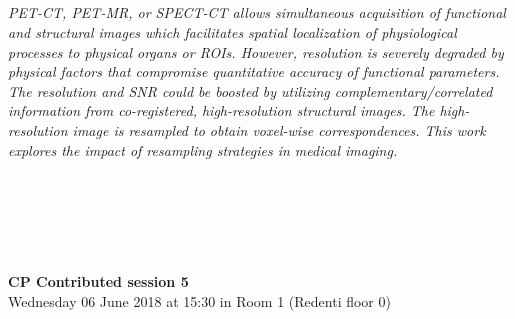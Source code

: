 \begin{multicols}{2}
      \\\\
      \\
      \\\\
      \\
      \\\\
\\
    \textit{PET-CT, PET-MR, or SPECT-CT allows simultaneous acquisition of functional and structural images which facilitates spatial localization of physiological processes to physical organs or ROIs. However, resolution is severely degraded by physical factors that compromise quantitative accuracy of functional parameters. The resolution and SNR could be boosted by utilizing complementary/correlated information from co-registered, high-resolution structural images. The high-resolution image is resampled to obtain voxel-wise correspondences. This work explores the impact of resampling strategies in medical imaging.}\\
\\ 
      \\
      \\\\
\\
  \end{multicols}
  \noindent\textbf{CP Contributed session 5}\\
    Wednesday 06 June 2018 at 15:30 in Room 1 (Redenti floor 0)  \\
  \textit{} \\
    
